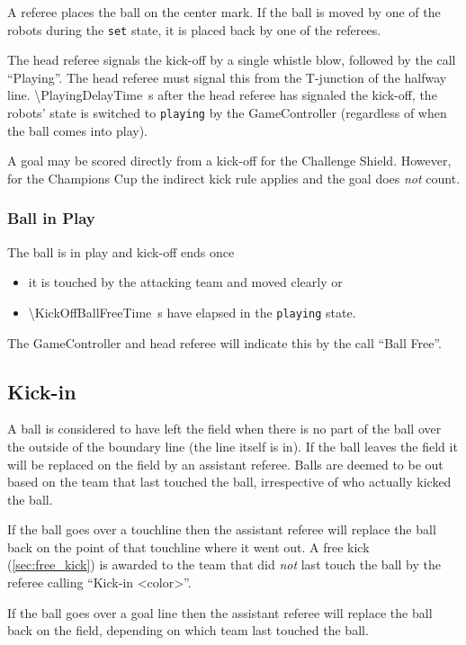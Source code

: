 A referee places the ball on the center mark.
If the ball is moved by one of the robots during the \texttt{set} state, it is placed back by one of the referees.

The head referee signals the kick-off by a single whistle blow, followed by the call ``Playing''.
The head referee must signal this from the T-junction of the halfway line.
\qty{\PlayingDelayTime}{\second} after the head referee has signaled the kick-off, the robots' state is switched to \texttt{playing} by the GameController (regardless of when the ball comes into play).

A goal may be scored directly from a kick-off for the Challenge Shield. However, for the Champions Cup the indirect kick rule applies and the goal does \textit{not} count.

\subsubsection{Ball in Play}

The ball is in play and kick-off ends once
\begin{itemize}
  \item it is touched by the attacking team and moved clearly or
  \item \qty{\KickOffBallFreeTime}{\second} have elapsed in the \texttt{playing} state.
\end{itemize}

The GameController and head referee will indicate this by the call ``Ball Free''.

\subsection{Kick-in}
\label{sec:kick_in}

A ball is considered to have left the field when there is no part of the ball over the outside of the boundary line (\ie the line itself is in).
If the ball leaves the field it will be replaced on the field by an assistant referee.
Balls are deemed to be out based on the team that last touched the ball, irrespective of who actually kicked the ball.

If the ball goes over a touchline then the assistant referee will replace the ball back on the point of that touchline where it went out.
A free kick (\cf \cref{sec:free_kick}) is awarded to the team that did \emph{not} last touch the ball by the referee calling ``Kick-in \textless color\textgreater''.

If the ball goes over a goal line then the assistant referee will replace the ball back on the field, depending on which team last touched the ball.

